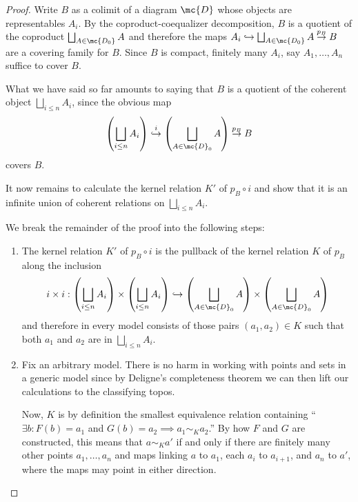 \begin{proof}
  Write $B$ as a colimit of a diagram $\mc{D}$ whose objects are representables $A_i$. By the coproduct-coequalizer decomposition, $B$ is a quotient of the coproduct $\bigsqcup_{A \in \mc{D_0}} A$ and therefore the maps $A_i \hookrightarrow \bigsqcup_{A \in \mc{D_0}} A \overset{p_B}{\to} B$ are a covering family for $B$. Since $B$ is compact, finitely many $A_i$, say $A_1, \dots, A_n$ suffice to cover $B$.

  What we have said so far amounts to saying that $B$ is a quotient of the coherent object $\bigsqcup_{i \leq n} A_i$, since the obvious map
  $$
\left(\bigsqcup_{i \leq n} A_i\right) \overset{i}{\hookrightarrow} \left(\bigsqcup_{A \in \mc{D}_0} A \right) \overset{p_B}{\to} B
$$
covers $B$.

It now remains to calculate the kernel relation $K'$ of $p_B \circ i$ and show that it is an infinite union of coherent relations on $\bigsqcup_{i \leq n} A_i$.

We break the remainder of the proof into the following steps:
\begin{enumerate}
\item The kernel relation $K'$ of $p_B \circ i$ is the pullback of the kernel relation $K$ of $p_B$ along the inclusion $$i \times i : \left(\bigsqcup_{i \leq n} A_i\right) \times \left(\bigsqcup_{i \leq n} A_i\right) \hookrightarrow \left(\bigsqcup_{A \in \mc{D}_0} A\right) \times \left(\bigsqcup_{A \in \mc{D}_0} A\right)$$ and therefore in every model consists of those pairs $(a_1, a_2) \in K$ such that both $a_1$ and $a_2$ are in $\bigsqcup_{i \leq n} A_i$.
  
\item Fix an arbitrary model. There is no harm in working with points and sets in a generic model since by Deligne's completeness theorem we can then lift our calculations to the classifying topos.

  Now, $K$ is by definition the smallest equivalence relation containing ``$\exists b : F(b) = a_1$ and $G(b) = a_2 \implies a_1 \sim_K a_2$.'' By how $F$ and $G$ are constructed, this means that $a \sim_K a'$ if and only if there are finitely many other points $a_1, \dots, a_n$ and maps linking $a$ to $a_1$, each $a_i$ to $a_{i+1}$, and $a_n$ to $a'$, where the maps may point in either direction.


\end{enumerate}
\end{proof}
